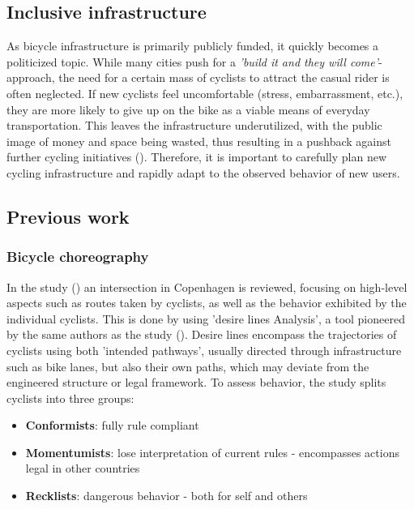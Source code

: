 \subsection{Inclusive infrastructure}
As bicycle infrastructure is primarily publicly funded, it quickly becomes a politicized topic. 
While many cities push for a \textit{'build it and they will come'}-approach, the need for a certain mass 
of cyclists to attract the casual rider is often neglected.
If new cyclists feel uncomfortable (stress, embarrassment, etc.), they are more likely to give up on the bike as a viable means of everyday transportation. 
This leaves the infrastructure underutilized, with the public image of money and space being wasted, 
thus resulting in a pushback against further cycling initiatives (\cite{backlash}).
Therefore, it is important to carefully plan new cycling infrastructure and rapidly adapt to the observed behavior of new users.

\subsection{Previous work}

\subsubsection{Bicycle choreography}
In the study (\cite{copenhagenize2014}) an intersection in Copenhagen is reviewed, focusing on high-level aspects
such as routes taken by cyclists, as well as the behavior exhibited by the individual cyclists.
This is done by using 'desire lines Analysis', a tool pioneered by the same authors as the study (\cite{copenhagenize_book}).
Desire lines encompass the trajectories of cyclists using both 'intended pathways', usually directed through infrastructure such as
 bike lanes, but also their own paths, which may deviate from the engineered structure or legal framework.
 To assess behavior, the study splits cyclists into three groups:

\begin{itemize}
	\item \textbf{Conformists}: fully rule compliant
	\item \textbf{Momentumists}: lose interpretation of current rules - encompasses actions legal in other countries
	\item \textbf{Recklists}: dangerous behavior - both for self and others
\end{itemize}

